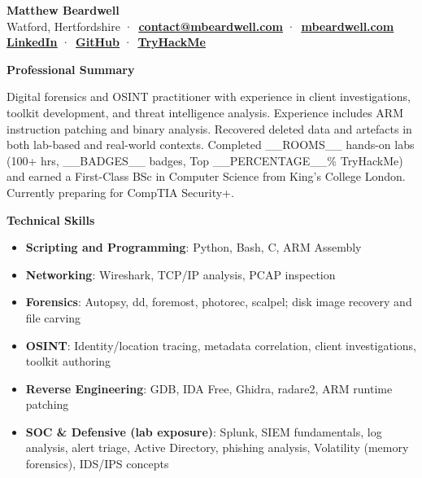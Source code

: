 \documentclass[10pt,a4paper]{article}
\newcommand{\paragap}{0.30em}
\newcommand{\headermargin}{0.00em}
\newcommand{\setfontsize}[2]{\fontsize{#1}{#1}\selectfont{}#2}
\newcommand{\textcolorbf}[1]{\textbf{\textcolor{surface}{#1}}}
\newcommand{\cvlink}[2]{\uline{\href{#1}{\textcolor{surface}{\textbf{#2}}}}}
\newenvironment{cvsection}[1]{
  \begin{tcolorbox}[
    colback=accent!25,
    boxrule=0pt,
    colframe=white,
    left=4pt,
    right=4pt,
    top=2pt,
    bottom=2pt,
    sharp corners=all,
    coltext=surface
  ]
    \textcolorbf{#1}
  \end{tcolorbox}
  \vspace{\headermargin}
}
{\vspace{\headermargin}}
\begin{document}
\begin{flushleft}
  {{\setfontsize{26pt}{\textcolorbf{Matthew Beardwell}}}} \\[1.1em]
  Watford, Hertfordshire ·\
  \cvlink{mailto:contact@mbeardwell.com}{contact@mbeardwell.com} ·\
  \cvlink{https://mbeardwell.com}{mbeardwell.com} \\
  \vspace{\paragap}
  \cvlink{https://linkedin.com/in/mbeardwell}{LinkedIn} ·\
  \cvlink{https://github.com/mbeardwell}{GitHub} ·\
  \cvlink{https://tryhackme.com/p/mbeardwell}{TryHackMe}
\end{flushleft}

\begin{cvsection}{Professional Summary}
  Digital forensics and OSINT practitioner with experience in client investigations, toolkit development, and threat intelligence analysis.
  Experience includes ARM instruction patching and binary analysis. Recovered deleted data and artefacts in both lab-based and real-world contexts.
  Completed __ROOMS__ hands-on labs (100+ hrs, __BADGES__ badges, Top __PERCENTAGE__\% TryHackMe) and earned a First-Class BSc in Computer Science from King’s College London. Currently preparing for CompTIA Security+.
\end{cvsection}

\begin{cvsection}{Technical Skills}
  \begin{itemize}[leftmargin=*]
    \item \textcolorbf{Scripting and Programming}: Python, Bash, C, ARM Assembly
    \item \textcolorbf{Networking}: Wireshark, TCP/IP analysis, PCAP inspection
    \item \textcolorbf{Forensics}: Autopsy, dd, foremost, photorec, scalpel; disk image recovery and file carving
    \item \textcolorbf{OSINT}: Identity/location tracing, metadata correlation, client investigations, toolkit authoring
    \item \textcolorbf{Reverse Engineering}: GDB, IDA Free, Ghidra, radare2, ARM runtime patching
    \item \textcolorbf{SOC \& Defensive (lab exposure)}: Splunk, SIEM fundamentals, log analysis, alert triage, Active Directory, phishing analysis, Volatility (memory forensics), IDS/IPS concepts
  \end{itemize}
\end{cvsection}
\end{document}
